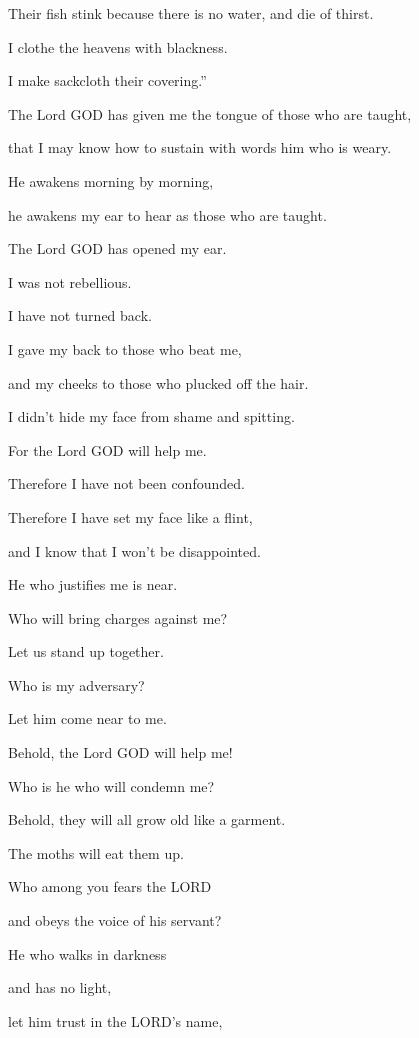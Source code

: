 Their fish stink because there is no water, and die of thirst.

\myverse{}I clothe the heavens with blackness.

I make sackcloth their covering.”


\vspace{\baselineskip} \myverse{}The Lord GOD has given me the tongue of those who are taught,

that I may know how to sustain with words him who is weary.

He awakens morning by morning,

he awakens my ear to hear as those who are taught.

\myverse{}The Lord GOD has opened my ear.

I was not rebellious.

I have not turned back.

\myverse{}I gave my back to those who beat me,

and my cheeks to those who plucked off the hair.

I didn’t hide my face from shame and spitting.

\myverse{}For the Lord GOD will help me.

Therefore I have not been confounded.

Therefore I have set my face like a flint,

and I know that I won’t be disappointed.

\myverse{}He who justifies me is near.

Who will bring charges against me?

Let us stand up together.

Who is my adversary?

Let him come near to me.

\myverse{}Behold, the Lord GOD will help me!

Who is he who will condemn me?

Behold, they will all grow old like a garment.

The moths will eat them up.


\vspace{\baselineskip} \myverse{}Who among you fears the LORD

and obeys the voice of his servant?

He who walks in darkness

and has no light,

let him trust in the LORD’s name,

